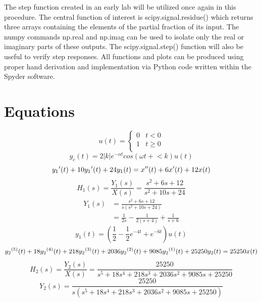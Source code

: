 \documentclass[12pt]{report}
\newcommand{\adj}{\hspace{0.001em}}
\begin{document}
The step function created in an early lab will be utilized once again in this procedure. The central function of interest is scipy.signal.residue() which returns three arrays containing the elements of the partial fraction of its input. The numpy commands np.real and np.imag can be used to isolate only the real or imaginary parts of these outputs. The scipy.signal.step() function will also be useful to verify step responses. All functions and plots can be produced using proper hand derivation and implementation via Python code written within the Spyder software. \\
	
\section{Equations}

\begin{equation*}
	u(t)=
	\begin{cases}
		0 & t < 0 \\
		1 & t \ge 0 \\
	\end{cases}
\end{equation*}
\begin{equation}
	y_c(t) = 2|k|e^{-\alpha t}cos(\omega t + \!< \! k)u(t)
\end{equation}
\begin{equation*}
	y_1\adj'(t) + 10y_1\adj'(t) + 24y_1(t) = x''(t) + 6x'(t) + 12x(t)
\end{equation*}
\begin{equation}
	H_1(s) = \frac{Y_1(s)}{X(s)} = \frac{s^2 + 6s + 12}{s^2 + 10s + 24}
\end{equation}
\begin{align}
	Y_1(s) &= \frac{s^2 + 6s + 12}{s(s^2 + 10s + 24)} \\
	&= \frac{1}{2s} - \frac{1}{2(s + 4)} + \frac{1}{s + 6}
\end{align}
\begin{equation}
	y_1(t) = (\frac{1}{2} - \frac{1}{2}e^{-4t} + e^{-6t})u(t)
\end{equation}
\begin{equation*}
	y_2\adj^{(5)}(t) + 18y_2\adj^{(4)}(t) + 218y_2\adj^{(3)}(t) + 2036y_2\adj^{(2)}(t) + 9085y_2\adj^{(1)}(t) + 25250y_2(t) = 25250x(t)
\end{equation*}
\begin{equation}
	H_2(s) = \frac{Y_2(s)}{X(s)} = \frac{25250}{s^5 + 18s^4 + 218s^3 + 2036s^2 + 9085s + 25250}
\end{equation}
\begin{equation}
	Y_2(s) = \frac{25250}{s(s^5 + 18s^4 + 218s^3 + 2036s^2 + 9085s + 25250)}
\end{equation}
	
\end{document}
